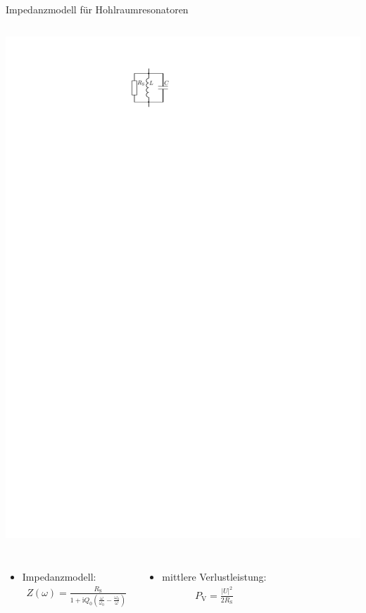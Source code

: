 \documentclass[12pt,xcolor=dvipsnames,professionalfonts]{beamer}
\begin{document}
\begin{frame}{Impedanzmodell für Hohlraumresonatoren}
\begin{columns}[c]
		\centering
		\includegraphics[scale=1.15]{./figures/RLC_circuit.pdf}
	\end{columns}
	\vfill
	\begin{columns}[T]
		\begin{itemize}
			\item Impedanzmodell:
			\begin{align*}
			Z(\omega) = \frac{R_\mathrm{S}}{1 + \mathrm{i} Q_0 \left( \frac{\omega}{\omega_0} - \frac{\omega_0}{\omega} \right)}
			\end{align*}
		\end{itemize}
		
		\begin{itemize}
			\item mittlere Verlustleistung:
			\begin{align*}
				P_\mathrm{V} = \frac{\left|U\right|^2}{2 R_\mathrm{S}}
			\end{align*}
		\end{itemize}
	\end{columns}
	

\end{frame}
\end{document}
